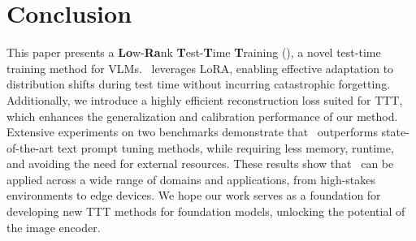 \section{Conclusion}
\label{sec:conclusion}

This paper presents a \textbf{Lo}w-\textbf{Ra}nk \textbf{T}est-\textbf{T}ime \textbf{T}raining (\name), a novel test-time training method for VLMs.
\name\ leverages LoRA, enabling effective adaptation to distribution shifts during test time without incurring catastrophic forgetting.
Additionally, we introduce a highly efficient reconstruction loss suited for TTT, which enhances the generalization and calibration performance of our method.
Extensive experiments on two benchmarks demonstrate that \name\ outperforms state-of-the-art text prompt tuning methods, while requiring less memory, runtime, and avoiding the need for external resources.
These results show that \name\ can be applied across a wide range of domains and applications, from high-stakes environments to edge devices.
We hope our work serves as a foundation for developing new TTT methods for foundation models, unlocking the potential of the image encoder.


